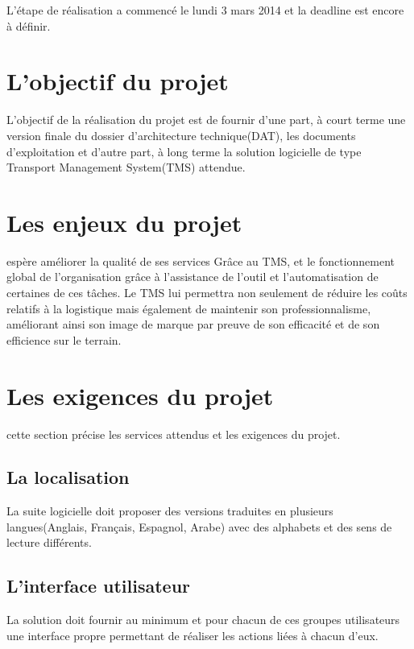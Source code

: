 L'étape de réalisation a commencé le lundi 3 mars 2014 et la deadline est encore à définir.

\section{L'objectif du projet}
 L'objectif de la réalisation du projet est  de fournir d'une part, à court terme une version finale du dossier d'architecture technique(DAT), les documents d'exploitation et d'autre part, à long terme la solution logicielle de type Transport Management System(TMS) attendue.
 
 \section{Les enjeux du projet}
\mo espère améliorer la qualité de ses services Grâce au TMS, et le fonctionnement global de l'organisation grâce à l'assistance de l'outil et l'automatisation de certaines de ces tâches. Le TMS lui permettra non seulement de réduire les coûts relatifs à la logistique mais également de maintenir son professionnalisme, améliorant ainsi son image de marque par preuve de son efficacité et de son efficience sur le terrain.

\section{Les exigences du projet}
cette section précise les services attendus et les exigences du projet.

\subsection{La localisation}
La suite logicielle doit proposer des versions traduites en plusieurs langues(Anglais, Français, Espagnol, Arabe) avec des alphabets et des sens de lecture différents.

\subsection{L'interface utilisateur}
La solution doit fournir au minimum et pour chacun de ces groupes utilisateurs une interface propre permettant de réaliser les actions liées à chacun d'eux.

